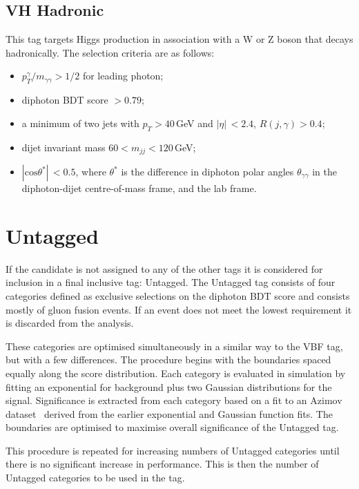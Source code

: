 \subsection{VH Hadronic}
This tag targets Higgs production in association with a W or Z boson that decays hadronically. The selection criteria are as follows:
\begin{itemize}[noitemsep]
    \item $p^{\gamma}_{T}/m_{\gamma\gamma} > 1/2$ for leading photon;
    \item diphoton BDT score $> 0.79$;
    \item a minimum of two jets with $p_T > 40$\,GeV and $|\eta|\, < 2.4$, $R(j,\gamma) > 0.4$;
    \item dijet invariant mass $60 < m_{jj} < 120$\,GeV;
    \item $|\mathrm{cos}{\theta^{*}}| \,< 0.5$, where $\theta^{*}$ is the difference in diphoton polar angles $\theta_{\gamma\gamma}$ in the diphoton-dijet centre-of-mass frame, and the lab frame.  
\end{itemize}




\section{Untagged}
If the candidate is not assigned to any of the other tags it is considered for inclusion in a final inclusive tag: Untagged. 
The Untagged tag consists of four categories defined as exclusive selections on the diphoton BDT score and consists mostly of gluon fusion events. 
If an event does not meet the lowest requirement it is discarded from the analysis.

These categories are optimised simultaneously in a similar way to the VBF tag, but with a few differences. 
The procedure begins with the boundaries spaced equally along the score distribution. Each category is evaluated in simulation by fitting an exponential for background plus two Gaussian distributions for the signal. 
Significance is extracted from each category based on a fit to an Azimov dataset~\cite{Azimov} derived from the earlier exponential and Gaussian function fits. 
The boundaries are optimised to maximise overall significance of the Untagged tag.

This procedure is repeated for increasing numbers of Untagged categories until there is no significant increase in performance. This is then the number of Untagged categories to be used in the tag.












